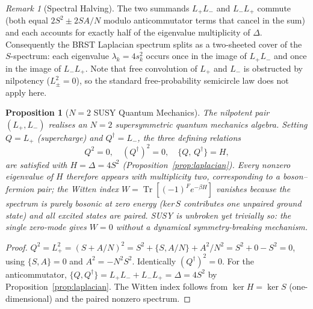 \documentclass[aip,jmp,reprint,superscriptaddress,floatfix,nofootinbib]{revtex4-2}
\newtheorem{proposition}[theorem]{Proposition}
\theoremstyle{definition}
\theoremstyle{remark}
\newtheorem{remark}[theorem]{Remark}
\begin{document}
\begin{remark}[Spectral Halving]
\label{rmk:spectral-halving}
The two summands $L_+L_-$ and $L_-L_+$ commute (both equal $2S^2 \pm 2SA/N$
modulo anticommutator terms that cancel in the sum) and each accounts for
exactly half of the eigenvalue multiplicity of $\Delta$.
Consequently the BRST Laplacian spectrum splits as a two-sheeted cover
of the $S$-spectrum: each eigenvalue $\lambda_k = 4s_k^2$ occurs once in
the image of $L_+L_-$ and once in the image of $L_-L_+$.
Note that free convolution of $L_+$ and $L_-$ is obstructed by nilpotency
($L_\pm^2 = 0$), so the standard free-probability semicircle law does not
apply here.
\end{remark}

\begin{proposition}[$N=2$ SUSY Quantum Mechanics]
\label{prop:susy-qm}
The nilpotent pair $(L_+, L_-)$ realises an $N{=}2$ supersymmetric quantum
mechanics algebra.  Setting $Q = L_+$ (supercharge) and $Q^\dagger = L_-$,
the three defining relations
\begin{equation}
  Q^2 = 0,\quad (Q^\dagger)^2 = 0,\quad \{Q,\, Q^\dagger\} = H,
\end{equation}
are satisfied with $H = \Delta = 4S^2$
(Proposition~\ref{prop:laplacian}).
Every nonzero eigenvalue of $H$ therefore appears with multiplicity two,
corresponding to a boson--fermion pair; the Witten index
$W = \operatorname{Tr}[(-1)^F e^{-\beta H}]$ vanishes because the
spectrum is purely bosonic at zero energy (ker\,$S$ contributes one
unpaired ground state) and all excited states are paired.
SUSY is unbroken yet trivially so: the single zero-mode gives $W = 0$
without a dynamical symmetry-breaking mechanism.
\end{proposition}
\begin{proof}
$Q^2 = L_+^2 = (S + A/N)^2 = S^2 + \{S, A/N\} + A^2/N^2
= S^2 + 0 - S^2 = 0$, using $\{S,A\}=0$ and $A^2 = -N^2 S^2$.
Identically $(Q^\dagger)^2 = 0$.  For the anticommutator,
$\{Q, Q^\dagger\} = L_+L_- + L_-L_+ = \Delta = 4S^2$
by Proposition~\ref{prop:laplacian}.  The Witten index follows from
$\ker H = \ker S$ (one-dimensional) and the paired nonzero spectrum.
\end{proof}
\end{document}
